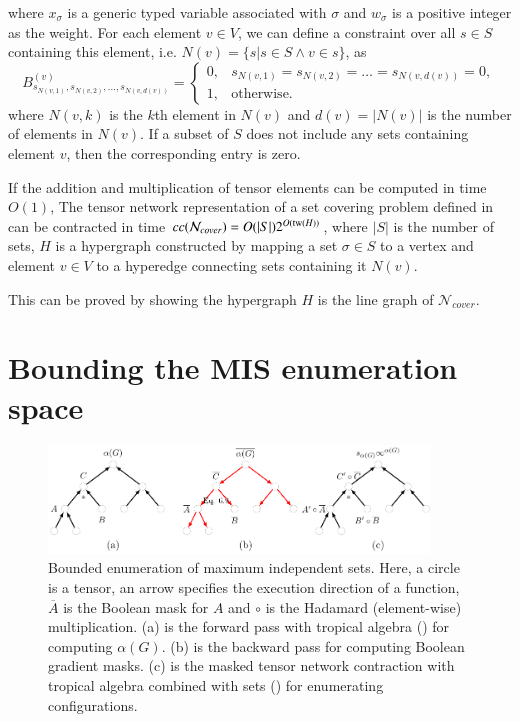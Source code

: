\documentclass[review, onefignum, onetabnum]{siamart190516}
\begin{document}
where $x_\sigma$ is a generic typed variable associated with $\sigma$ and $w_\sigma$ is a positive integer as the weight.
For each element $v \in V$, we can define a constraint over all $s \in S$ containing this element, i.e. $N(v) = \{s | s \in S \land v\in s\}$, as
\begin{equation}
B^{(v)}_{s_{N(v, 1)}, s_{N(v, 2)}, \ldots, s_{N(v, d(v))}} = \begin{cases}
    0, & s_{N(v, 1)}=s_{N(v, 2)}=\ldots=s_{N(v, d(v))}=0,\\
    1, & \text{otherwise}.
\end{cases}
\end{equation}
where $N(v, k)$ is the $k$th element in $N(v)$ and $d(v) = |N(v)|$ is the number of elements in $N(v)$. 
If a subset of $S$ does not include any sets containing element $v$, then the corresponding entry is zero.

\begin{theorem}\label{thm:covercomplex}
    If the addition and multiplication of tensor elements can be computed in time $O(1)$,
    The tensor network representation of a set covering problem defined in  can be contracted in time $cc(\mathcal{N}_{cover}) = O(|S|)2^{O({\rm tw}(H))}$, where $|S|$ is the number of sets,
    $H$ is a hypergraph constructed by mapping a set $\sigma\in S$ to a vertex and element $v \in V$ to a hyperedge connecting sets containing it $N(v)$.
\end{theorem}
This can be proved by showing the hypergraph $H$ is the line graph of $\mathcal{N}_{cover}$.

\section{Bounding the MIS enumeration space}\label{sec:bounding}
\begin{figure}
    \centering
    \includegraphics[width=0.9\textwidth, trim={0cm 0cm 0cm 0cm}, clip]{figures/masktree.pdf}
    \caption{Bounded enumeration of maximum independent sets. Here, a circle is a tensor, an arrow specifies the execution direction of a function, $\overline A$ is the Boolean mask for $A$ and $\circ$ is the Hadamard (element-wise) multiplication. (a) is the forward pass with tropical algebra () for computing $\alpha(G)$.
     (b) is the backward pass for computing Boolean gradient masks.
     (c) is the masked tensor network contraction with tropical algebra combined with sets () for enumerating configurations.}
     \label{fig:bounding}
\end{figure}
\end{document}
